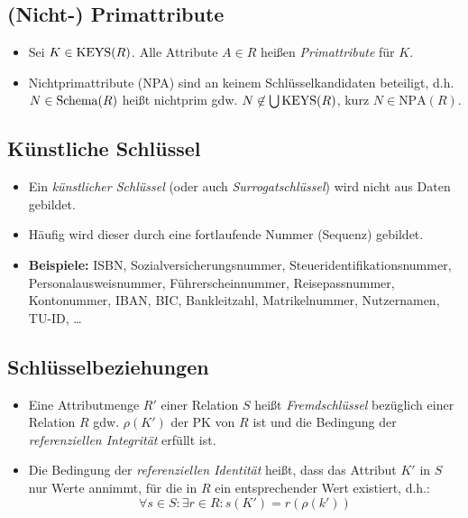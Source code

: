 	\subsection{(Nicht-) Primattribute} %
		\begin{itemize}
			\item Sei \( K \in \operatorname{KEYS}(R) \). Alle Attribute \( A \in R \) heißen \textit{Primattribute} für \(K\).
			\item Nichtprimattribute (NPA) sind an keinem Schlüsselkandidaten beteiligt, d.h. \( N \in \operatorname{Schema}(R) \) heißt nichtprim gdw. \( N \not\in \bigcup \operatorname{KEYS}(R) \), kurz \( N \in \text{NPA}(R) \).
		\end{itemize}

	\subsection{Künstliche Schlüssel} %
		\begin{itemize}
			\item Ein \textit{künstlicher Schlüssel} (oder auch \textit{Surrogatschlüssel}) wird nicht aus Daten gebildet.
			\item Häufig wird dieser durch eine fortlaufende Nummer (Sequenz) gebildet.
			\item \textbf{Beispiele:} ISBN, Sozialversicherungsnummer, Steueridentifikationsnummer, Personalausweisnummer, Führerscheinnummer, Reisepassnummer, Kontonummer, IBAN, BIC, Bankleitzahl, Matrikelnummer, Nutzernamen, TU-ID, \dots
		\end{itemize}

	\subsection{Schlüsselbeziehungen} %
		\begin{itemize}
			\item Eine Attributmenge \(R'\) einer Relation \(S\) heißt \textit{Fremdschlüssel} bezüglich einer Relation \(R\) gdw. \( \rho(K') \) der PK von \(R\) ist und die Bedingung der \textit{referenziellen Integrität} erfüllt ist.
			\item Die Bedingung der \textit{referenziellen Identität} heißt, dass das Attribut \(K'\) in \(S\) nur Werte annimmt, für die in \(R\) ein entsprechender Wert existiert, d.h.:
				\begin{equation*}
					\forall s \in S : \exists r \in R : s(K') = r(\rho(k'))
				\end{equation*}
		\end{itemize}

